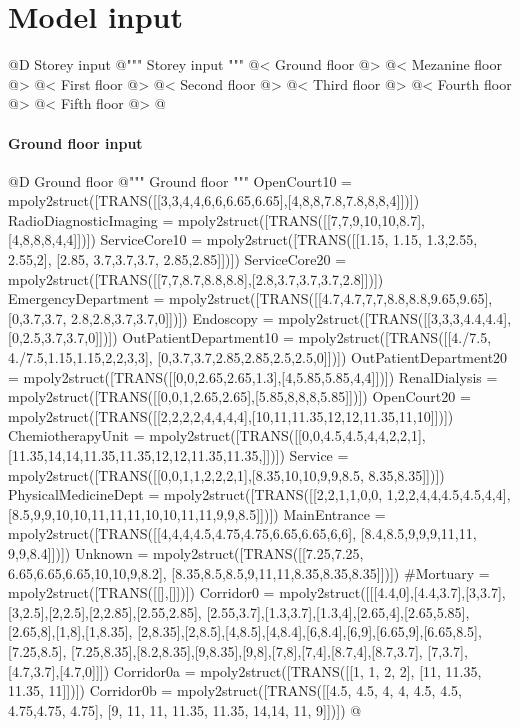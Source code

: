 \documentclass[11pt,oneside]{article}    %
\begin{document}
\section{Model input}


@D Storey input
@{""" Storey input """
@< Ground floor @>
@< Mezanine floor @>
@< First floor @>
@< Second floor @>
@< Third floor @>
@< Fourth floor @>
@< Fifth floor @>
@}


\paragraph{Ground floor input}
@D Ground floor 
@{""" Ground floor """
OpenCourt10 = mpoly2struct([TRANS([[3,3,4,4,6,6,6.65,6.65],[4,8,8,7.8,7.8,8,8,4]])])
RadioDiagnosticImaging = mpoly2struct([TRANS([[7,7,9,10,10,8.7],[4,8,8,8,4,4]])])
ServiceCore10 = mpoly2struct([TRANS([[1.15, 1.15, 1.3,2.55, 2.55,2], [2.85, 3.7,3.7,3.7, 2.85,2.85]])])
ServiceCore20 = mpoly2struct([TRANS([[7,7,8.7,8.8,8.8],[2.8,3.7,3.7,3.7,2.8]])])
EmergencyDepartment = mpoly2struct([TRANS([[4.7,4.7,7,7,8.8,8.8,9.65,9.65],[0,3.7,3.7, 2.8,2.8,3.7,3.7,0]])])
Endoscopy = mpoly2struct([TRANS([[3,3,3,4.4,4.4],[0,2.5,3.7,3.7,0]])])
OutPatientDepartment10 = mpoly2struct([TRANS([[4./7.5, 4./7.5,1.15,1.15,2,2,3,3], [0,3.7,3.7,2.85,2.85,2.5,2.5,0]])])
OutPatientDepartment20 = mpoly2struct([TRANS([[0,0,2.65,2.65,1.3],[4,5.85,5.85,4,4]])])
RenalDialysis = mpoly2struct([TRANS([[0,0,1,2.65,2.65],[5.85,8,8,8,5.85]])])
OpenCourt20 = mpoly2struct([TRANS([[2,2,2,2,4,4,4,4],[10,11,11.35,12,12,11.35,11,10]])])
ChemiotherapyUnit = mpoly2struct([TRANS([[0,0,4.5,4.5,4,4,2,2,1], [11.35,14,14,11.35,11.35,12,12,11.35,11.35,]])])
Service = mpoly2struct([TRANS([[0,0,1,1,2,2,2,1],[8.35,10,10,9,9,8.5, 8.35,8.35]])])
PhysicalMedicineDept = mpoly2struct([TRANS([[2,2,1,1,0,0, 1,2,2,4,4,4.5,4.5,4,4], [8.5,9,9,10,10,11,11,11,10,10,11,11,9,9,8.5]])])
MainEntrance = mpoly2struct([TRANS([[4,4,4,4.5,4.75,4.75,6.65,6.65,6,6], [8.4,8.5,9,9,9,11,11, 9,9,8.4]])])
Unknown = mpoly2struct([TRANS([[7.25,7.25, 6.65,6.65,6.65,10,10,9,8.2], [8.35,8.5,8.5,9,11,11,8.35,8.35,8.35]])])
#Mortuary = mpoly2struct([TRANS([[],[]])])
Corridor0 = mpoly2struct([[[4.4,0],[4.4,3.7],[3,3.7],[3,2.5],[2,2.5],[2,2.85],[2.55,2.85], [2.55,3.7],[1.3,3.7],[1.3,4],[2.65,4],[2.65,5.85],[2.65,8],[1,8],[1,8.35], [2,8.35],[2,8.5],[4,8.5],[4,8.4],[6,8.4],[6,9],[6.65,9],[6.65,8.5],[7.25,8.5], [7.25,8.35],[8.2,8.35],[9,8.35],[9,8],[7,8],[7,4],[8.7,4],[8.7,3.7], [7,3.7],[4.7,3.7],[4.7,0]]])
Corridor0a = mpoly2struct([TRANS([[1, 1, 2, 2], [11, 11.35, 11.35, 11]])])
Corridor0b = mpoly2struct([TRANS([[4.5, 4.5, 4, 4, 4.5, 4.5, 4.75,4.75, 4.75], [9, 11, 11, 11.35, 11.35, 14,14, 11, 9]])])
@}
\end{document}
